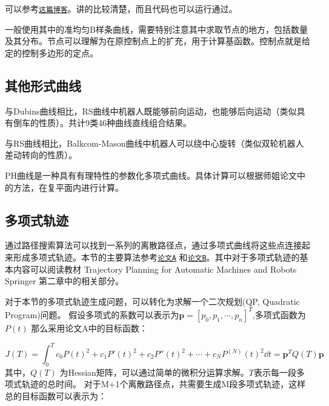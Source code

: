 
可以参考\href{https://blog.csdn.net/Mr_Grit/article/details/45603627}{\texttt{这篇博客}}。讲的比较清楚，而且代码也可以运行通过。

一般使用其中的准均匀B样条曲线，需要特别注意其中求取节点的地方，包括数量及其分布。节点可以理解为在原控制点上的扩充，用于计算基函数。控制点就是给定的控制多边形的定点。




\subsection{其他形式曲线}

与Dubins曲线相比，RS曲线中机器人既能够前向运动，也能够后向运动（类似具有倒车的性质）。共计9类46种曲线直线组合结果。


与RS曲线相比，Balkcom-Mason曲线中机器人可以绕中心旋转（类似双轮机器人差动转向的性质）。


PH曲线是一种具有有理特性的参数化多项式曲线。具体计算可以根据师姐论文中的方法，在复平面内进行计算。

\subsection{多项式轨迹}
通过路径搜索算法可以找到一系列的离散路径点，通过多项式曲线将这些点连接起来形成多项式轨迹。本节的主要算法参考\href{https://pdfs.semanticscholar.org/2376/078d13761387cabb933798b93a706c2ea7ef.pdf}{\texttt{论文A}}
和\href{http://www-personal.acfr.usyd.edu.au/spns/cdm/papers/Mellinger.pdf}{\texttt{论文B}}。其中对于多项式轨迹的基本内容可以阅读教材 Trajectory Planning for Automatic Machines and Robots Springer 第二章中的相关部分。

对于本节的多项式轨迹生成问题，可以转化为求解一个二次规划(QP, Quadratic Program)问题。
假设多项式的系数可以表示为$\bm{p} = [p_0, p_1, \cdots, p_n]^T$,多项式函数为$P(t)$ 那么采用论文A中的目标函数：

\begin{equation}
    J(T) = \int_0^T c_0 P(t)^2 + c_1 P'(t)^2 + c_2 P''(t)^2 + \cdots + c_N P^{(N)}(t)^2 \dd t = \bm{p}^T Q(T) \bm{p}
\end{equation}
其中，$Q(T)$ 为Hessian矩阵，可以通过简单的微积分运算求解。$T$表示每一段多项式轨迹的总时间。
对于M+1个离散路径点，共需要生成M段多项式轨迹，这样总的目标函数可以表示为：

